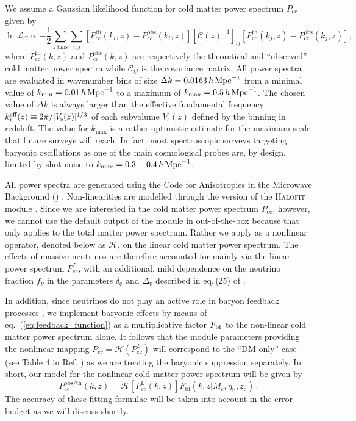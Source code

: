 \documentclass[a4paper,11pt]{article}
\newcommand{\be}{\begin{equation}}
\newcommand{\ee}{\end{equation}}
\def\camb{{\sc{CAMB}}\xspace}
\def\halofit{{\sc{Halofit}}\xspace}
\def\kMpc{\, h \, {\rm Mpc}^{-1}}
\newcommand{\eq}[1]{eq.~(\ref{#1})}
\begin{document}
{We assume a Gaussian likelihood function for cold matter power spectrum $P_\mathrm{cc}$ given by
\be
\ln \mathcal{L}_C \propto -\frac{1}{2} \sum_{z \ \mathrm{bins}} \sum_{i,j} \left[P^\mathrm{th}_\textrm{cc}(k_i,z) - P^\mathrm{obs}_\textrm{cc}(k_i,z)\right]
\left[\mathcal{C}(z)^{-1}\right]_{ij}
\left[P^\mathrm{th}_\textrm{cc}(k_j,z) - P^\mathrm{obs}_\textrm{cc}(k_j,z)\right],
\label{eq:likelihood_Pk}
\ee
where  $P^\mathrm{th}_\textrm{cc}(k,z)$ and $P^\mathrm{obs}_\textrm{cc}(k,z)$} are respectively the theoretical and ``observed'' cold matter power spectra while $\mathcal{C}_{ij}$ is the covariance matrix. All power spectra are evaluated in wavenumber bins of size $\Delta k=0.0163\kMpc$ from a minimal value of $k_\textrm{min}=0.01\kMpc$ to a maximum of $k_\textrm{max}=0.5\kMpc$. The chosen value of $\Delta k$ is always larger  than the effective fundamental frequency $k_\textrm f^\textrm{eff}(z)\equiv 2\pi/[V_\textrm{s}(z)]^{1/3}$ of each subvolume $V_\textrm{s}(z)$ defined by the binning in redshift. The value for $k_\textrm{max}$ is a rather optimistic estimate for the maximum scale that future surveys will reach. In fact, most spectroscopic surveys targeting baryonic oscillations as one of the main cosmological probes are, by design, limited by shot-noise to $k_\textrm{max}=0.3-0.4 \kMpc$.

All power spectra are generated using the Code for Anisotropies in the Microwave Background (\camb) \cite{Camb}. Non-linearities are modelled through the version of the \textsc{Halofit} module \cite{Mead-b+15, Mead-nu+16}.  Since we are interested in the cold matter power spectrum $P_\textrm{cc}$, however, we cannot use the default output of the \halofit module in \camb  out-of-the-box because that only applies to the total matter power spectrum. Rather we apply \halofit as a nonlinear operator, denoted below as  $\mathcal{H}$, on the linear cold matter power spectrum. The effects of massive neutrinos are therefore accounted for mainly via the linear power spectrum $P_\textrm{cc}^L$, with an additional, mild dependence on the neutrino fraction $f_\nu$ in the \halofit parameters $\delta_\mathrm c$ and $\Delta_v$ described in eq.\,(25) of  \cite{Mead-nu+16}. 

 In addition, since neutrinos do not play an active role in baryon feedback processes \cite{nuLCDM3+13}, we implement baryonic effects by means of \eq{eq:feedback_function} as a multiplicative factor $F_{\rm bf}$ to the non-linear cold matter power spectrum alone. It follows that the \halofit module parameters providing the nonlinear mapping $P_{cc}=\mathcal{H}(P^L_\mathrm{cc})$ will correspond to the ``DM only'' case (see Table 4 in Ref. \cite{Mead-b+15}) as we are treating the baryonic suppression separately. In short, our model for the nonlinear cold matter power spectrum will be given by 
\be
P^\textrm{obs/th}_\mathrm{cc}(k,z) = \mathcal{H}\left[P_\mathrm{cc}^\mathrm{L}(k,z)\right] F_\mathrm{bf}(k,z|M_c, \eta_\mathrm b, z_\mathrm c)\,.
\label{eq:power_spectrum_observed}
\ee
The accuracy of these fitting formulae will be taken into account in the error budget as we will discuss shortly.
\end{document}
